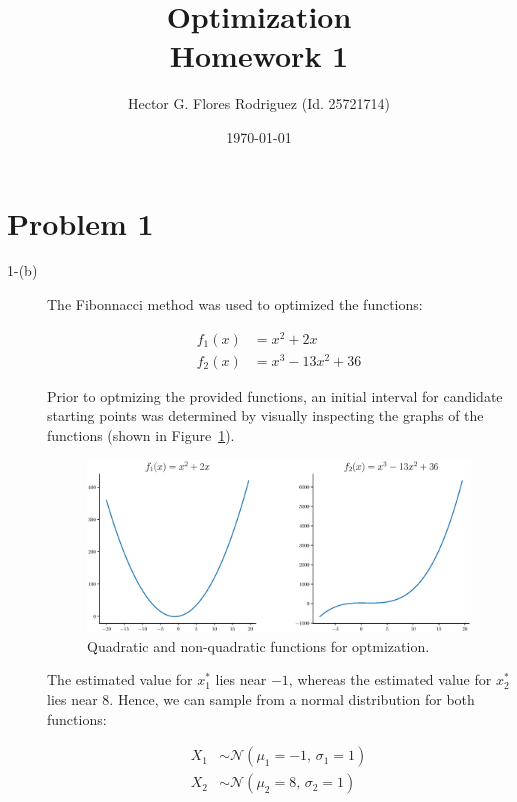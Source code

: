 \documentclass[11pt,onside]{article}
\title{\blue Optimization \\
\blueb Homework 1}
\author{Hector G. Flores Rodriguez (Id. 25721714)}
\date{\today} %
\begin{document}
\maketitle

\section{Problem 1}
\begin{description}
\item[1-(b)] The Fibonnacci method was used to optimized the functions:

\begin{align*}
f_{1}(x) &= x^2 + 2x \\
f_{2}(x) &= x^3 - 13x^2 + 36
\end{align*}

Prior to optmizing the provided functions, an initial interval for candidate starting points was determined by visually inspecting the graphs of the functions (shown in Figure~\ref{fig:functions}). 

\begin{figure}[h]
  \includegraphics[width=\linewidth]{figs/functions.eps}
  \caption{Quadratic and non-quadratic functions for optmization.}
  \label{fig:functions}
\end{figure}

The estimated value for $x_{1}^*$ lies near $-1$, whereas the estimated value for $x_{2}^*$ lies near $8$. Hence, we can sample from a normal distribution for both functions:

\begin{align*}
X_1 &\sim \mathcal{N}(\mu_{1} = -1,\,\sigma_{1} = 1) \\
X_2 &\sim \mathcal{N}(\mu_{2} = 8,\,\sigma_{2} = 1)
\end{align*}




\end{description}
\end{document}
